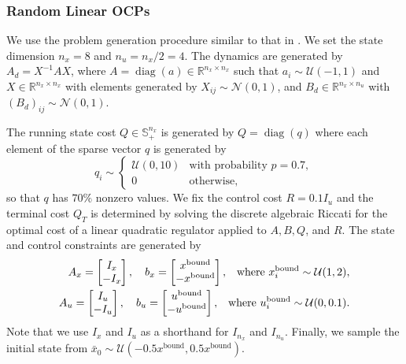 \documentclass{article} %
\def\gN{{\mathcal{N}}}
\def\gU{{\mathcal{U}}}
\def\sR{{\mathbb{R}}}
\def\sS{{\mathbb{S}}}
\DeclareMathOperator{\diag}{diag}
\newcommand{\hquad}{\hspace{0.5em}}
\begin{document}
\subsubsection{Random Linear OCPs}
We use the problem generation procedure similar to that in \citet{stellato2020osqp}. We set the state dimension $n_x = 8$ and $n_u = n_x/2 = 4$. The dynamics are generated by $A_d = X^{-1}AX$, where $A = \diag(a)\in\sR^{n_x\times n_x}$ such that $a_i\sim \gU(-1, 1)$ and $X\in\sR^{n_x\times n_x}$ with elements generated by $X_{ij} \sim \gN(0, 1)$, and $B_d\in\sR^{n_x\times n_u}$ with $(B_{d})_{ij} \sim \gN(0, 1)$.

The running state cost $Q\in \sS_+^{n_x}$ is generated by $Q = \diag(q)$ where each element of the sparse vector $q$ is generated by
\begin{equation}
    q_i \sim \begin{cases}
        \gU(0, 10) & \text{with probability } p =0.7,\\
        0 & \text{otherwise},
    \end{cases}
\end{equation}
so that $q$ has $70\%$ nonzero values. We fix the control cost $R = 0.1I_u$ and the terminal cost $Q_T$ is determined by solving the discrete algebraic Riccati for the optimal cost of a linear quadratic regulator applied to $A, B, Q$, and $R$. The state and control constraints are generated by
\begin{subequations}
    \begin{align}
        A_x = \begin{bmatrix} I_x \\ -I_x\end{bmatrix}, \quad b_x = \begin{bmatrix} x^{\text{bound}} \\ -x^{\text{bound}} \end{bmatrix}, \hquad \text{ where }x_i^{\text{bound}}\sim \gU(1, 2), \\
        A_u = \begin{bmatrix} I_u \\ -I_u\end{bmatrix}, \quad b_u = \begin{bmatrix} u^{\text{bound}} \\ -u^{\text{bound}} \end{bmatrix}, \hquad \text{ where }u_i^{\text{bound}}\sim \gU(0, 0.1).
    \end{align}
\end{subequations}
Note that we use $I_x$ and $I_u$ as a shorthand for $I_{n_x}$ and $I_{n_u}$. Finally, we sample the initial state from $\bar{x}_{0}\sim \gU(-0.5x^{\text{bound}}, 0.5x^{\text{bound}})$.
\end{document}
